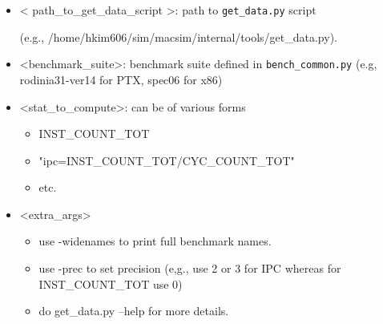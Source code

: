 \begin{itemize}
  \item < path\_to\_get\_data\_script >: path to \Verb+get_data.py+ script

        (e.g., /home/hkim606/sim/macsim/internal/tools/get\_data.py).
  \item <benchmark\_suite>: benchmark suite defined in \Verb+bench_common.py+
        (e.g, rodinia31-ver14 for PTX, spec06 for x86)
  \item <stat\_to\_compute>: can be of various forms
  \begin{itemize}
    \item INST\_COUNT\_TOT
    \item "ipc=INST\_COUNT\_TOT/CYC\_COUNT\_TOT"
    \item etc.
  \end{itemize}
  \item <extra\_args>
  \begin{itemize}
    \item use -widenames to print full benchmark names.
    \item use -prec to set precision (e,g., use 2 or 3 for IPC whereas for INST\_COUNT\_TOT use 0)
    \item do get\_data.py --help for more details.
  \end{itemize}
\end{itemize}


